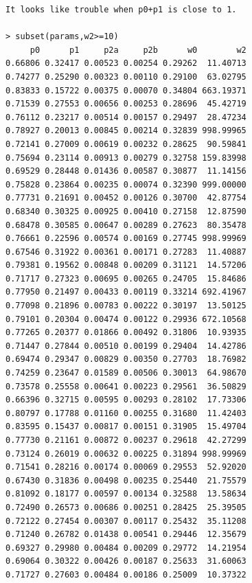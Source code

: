 \documentclass[12pt,letterpaper]{article}\usepackage[]{graphicx}\usepackage[]{color}
\begin{document}
\clearpage

\begin{lstlisting}
It looks like trouble when p0+p1 is close to 1.

> subset(params,w2>=10)
     p0      p1     p2a     p2b      w0        w2
0.66806 0.32417 0.00523 0.00254 0.29262  11.40713
0.74277 0.25290 0.00323 0.00110 0.29100  63.02795
0.83833 0.15722 0.00375 0.00070 0.34804 663.19371
0.71539 0.27553 0.00656 0.00253 0.28696  45.42719
0.76112 0.23217 0.00514 0.00157 0.29497  28.47234
0.78927 0.20013 0.00845 0.00214 0.32839 998.99965
0.72141 0.27009 0.00619 0.00232 0.28625  90.59841
0.75694 0.23114 0.00913 0.00279 0.32758 159.83998
0.69529 0.28448 0.01436 0.00587 0.30877  11.14156
0.75828 0.23864 0.00235 0.00074 0.32390 999.00000
0.77731 0.21691 0.00452 0.00126 0.30700  42.87754
0.68340 0.30325 0.00925 0.00410 0.27158  12.87590
0.68478 0.30585 0.00647 0.00289 0.27623  80.35478
0.76661 0.22596 0.00574 0.00169 0.27745 998.99969
0.67546 0.31922 0.00361 0.00171 0.27283  11.40887
0.79381 0.19562 0.00848 0.00209 0.31121  14.57206
0.71717 0.27323 0.00695 0.00265 0.24705  15.84686
0.77950 0.21497 0.00433 0.00119 0.33214 692.41967
0.77098 0.21896 0.00783 0.00222 0.30197  13.50125
0.79101 0.20304 0.00474 0.00122 0.29936 672.10568
0.77265 0.20377 0.01866 0.00492 0.31806  10.93935
0.71447 0.27844 0.00510 0.00199 0.29404  14.42786
0.69474 0.29347 0.00829 0.00350 0.27703  18.76982
0.74259 0.23647 0.01589 0.00506 0.30013  64.98670
0.73578 0.25558 0.00641 0.00223 0.29561  36.50829
0.66396 0.32715 0.00595 0.00293 0.28102  17.73306
0.80797 0.17788 0.01160 0.00255 0.31680  11.42403
0.83595 0.15437 0.00817 0.00151 0.31905  15.49704
0.77730 0.21161 0.00872 0.00237 0.29618  42.27299
0.73124 0.26019 0.00632 0.00225 0.31894 998.99969
0.71541 0.28216 0.00174 0.00069 0.29553  52.92020
0.67430 0.31836 0.00498 0.00235 0.25440  21.75579
0.81092 0.18177 0.00597 0.00134 0.32588  13.58634
0.72490 0.26573 0.00686 0.00251 0.28425  25.39505
0.72122 0.27454 0.00307 0.00117 0.25432  35.11208
0.71240 0.26782 0.01438 0.00541 0.29446  12.35679
0.69327 0.29980 0.00484 0.00209 0.29772  14.21954
0.69064 0.30322 0.00426 0.00187 0.25633  31.60063
0.71727 0.27603 0.00484 0.00186 0.25009  10.37322
\end{lstlisting}
\end{document}
